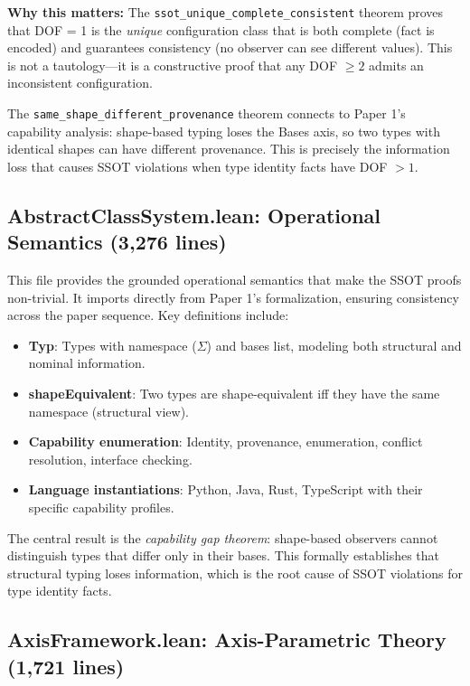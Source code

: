 \textbf{Why this matters:} The \texttt{ssot\_unique\_complete\_consistent} theorem proves that DOF = 1 is the \emph{unique} configuration class that is both complete (fact is encoded) and guarantees consistency (no observer can see different values). This is not a tautology---it is a constructive proof that any DOF $\geq 2$ admits an inconsistent configuration.

The \texttt{same\_shape\_different\_provenance} theorem connects to Paper 1's capability analysis: shape-based typing loses the Bases axis, so two types with identical shapes can have different provenance. This is precisely the information loss that causes SSOT violations when type identity facts have DOF $> 1$.

\subsection{AbstractClassSystem.lean: Operational Semantics (3,276 lines)}\label{sec:lean-abstract-class}

This file provides the grounded operational semantics that make the SSOT proofs non-trivial. It imports directly from Paper 1's formalization, ensuring consistency across the paper sequence. Key definitions include:

\begin{itemize}
\item \textbf{Typ}: Types with namespace ($\Sigma$) and bases list, modeling both structural and nominal information.
\item \textbf{shapeEquivalent}: Two types are shape-equivalent iff they have the same namespace (structural view).
\item \textbf{Capability enumeration}: Identity, provenance, enumeration, conflict resolution, interface checking.
\item \textbf{Language instantiations}: Python, Java, Rust, TypeScript with their specific capability profiles.
\end{itemize}

The central result is the \emph{capability gap theorem}: shape-based observers cannot distinguish types that differ only in their bases. This formally establishes that structural typing loses information, which is the root cause of SSOT violations for type identity facts.

\subsection{AxisFramework.lean: Axis-Parametric Theory (1,721 lines)}\label{sec:lean-axis}

